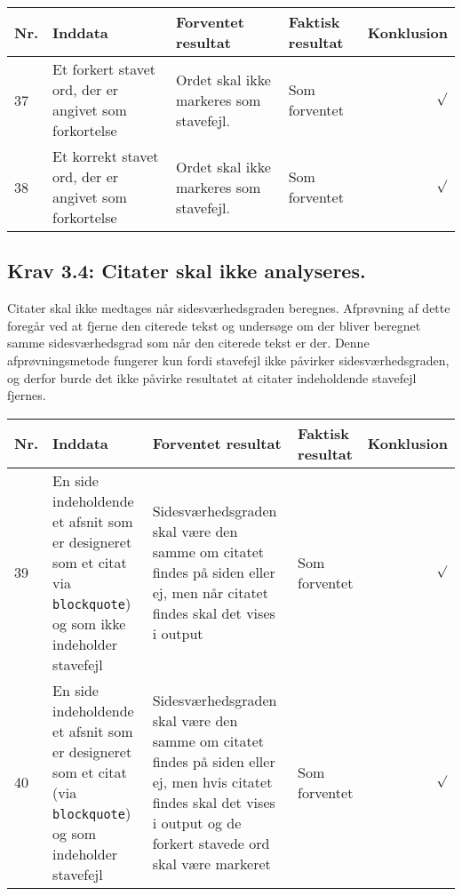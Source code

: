 \documentclass[a4paper,oneside,article]{memoir}
\begin{document}
\begin{landscape}
\begin{longtable}[c]{p{20pt}|p{220pt}|p{130pt}|p{130pt}|r}
\textbf{Nr.} &
\textbf{Inddata} &
\textbf{Forventet resultat} &
\textbf{Faktisk resultat} &
\textbf{Konklusion} \\ \hline

37 &
Et forkert stavet ord, der er angivet som forkortelse &
Ordet skal ikke markeres som stavefejl. &
Som forventet &
$\surd$ \\ \hline

38 &
Et korrekt stavet ord, der er angivet som forkortelse &
Ordet skal ikke markeres som stavefejl. &
Som forventet &
$\surd$ \\ \hline

\end{longtable}

\subsection{Krav 3.4: Citater skal ikke analyseres.}

Citater skal ikke medtages når sidesværhedsgraden beregnes. Afprøvning
af dette foregår ved at fjerne den citerede tekst og undersøge om der
bliver beregnet samme sidesværhedsgrad som når den citerede tekst er
der. Denne afprøvningsmetode fungerer kun fordi stavefejl ikke
påvirker sidesværhedsgraden, og derfor burde det ikke påvirke
resultatet at citater indeholdende stavefejl fjernes.

\begin{longtable}[c]{p{20pt}|p{220pt}|p{130pt}|p{130pt}|r}
\textbf{Nr.} &
\textbf{Inddata} &
\textbf{Forventet resultat} &
\textbf{Faktisk resultat} &
\textbf{Konklusion} \\ \hline

39 &
En side indeholdende et afsnit som er designeret som et citat
via \texttt{blockquote}) og som ikke indeholder stavefejl &
Sidesværhedsgraden skal være den samme om citatet findes på siden
eller ej, men når citatet findes skal det vises i output &
Som forventet &
$\surd$ \\ \hline

40 &
En side indeholdende et afsnit som er designeret som et citat (via
\texttt{blockquote}) og som indeholder stavefejl &
Sidesværhedsgraden skal være den samme om citatet findes på siden
eller ej, men hvis citatet findes skal det vises i output og de
forkert stavede ord skal være markeret &
Som forventet &
$\surd$ \\ \hline

\end{longtable}


\end{landscape}
\end{document}
